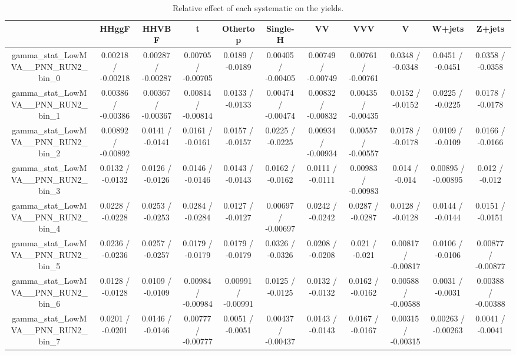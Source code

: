 \documentclass[10pt]{article}
\begin{document}
\begin{table}[htbp]
\begin{center}
\begin{tabular}{|c|c|c|c|c|c|c|c|c|c|c|}
\hline 
      & HHggF      & HHVBF      & t      & Othertop      & Single-H      & VV      & VVV      & V      & W+jets      & Z+jets \\ 
\hline 
  gamma_stat_LowMVA__PNN_RUN2_bin_0 & 0.00218 / -0.00218 & 0.00287 / -0.00287 & 0.00705 / -0.00705 & 0.0189 / -0.0189 & 0.00405 / -0.00405 & 0.00749 / -0.00749 & 0.00761 / -0.00761 & 0.0348 / -0.0348 & 0.0451 / -0.0451 & 0.0358 / -0.0358 \\ 
  gamma_stat_LowMVA__PNN_RUN2_bin_1 & 0.00386 / -0.00386 & 0.00367 / -0.00367 & 0.00814 / -0.00814 & 0.0133 / -0.0133 & 0.00474 / -0.00474 & 0.00832 / -0.00832 & 0.00435 / -0.00435 & 0.0152 / -0.0152 & 0.0225 / -0.0225 & 0.0178 / -0.0178 \\ 
  gamma_stat_LowMVA__PNN_RUN2_bin_2 & 0.00892 / -0.00892 & 0.0141 / -0.0141 & 0.0161 / -0.0161 & 0.0157 / -0.0157 & 0.0225 / -0.0225 & 0.00934 / -0.00934 & 0.00557 / -0.00557 & 0.0178 / -0.0178 & 0.0109 / -0.0109 & 0.0166 / -0.0166 \\ 
  gamma_stat_LowMVA__PNN_RUN2_bin_3 & 0.0132 / -0.0132 & 0.0126 / -0.0126 & 0.0146 / -0.0146 & 0.0143 / -0.0143 & 0.0162 / -0.0162 & 0.0111 / -0.0111 & 0.00983 / -0.00983 & 0.014 / -0.014 & 0.00895 / -0.00895 & 0.012 / -0.012 \\ 
  gamma_stat_LowMVA__PNN_RUN2_bin_4 & 0.0228 / -0.0228 & 0.0253 / -0.0253 & 0.0284 / -0.0284 & 0.0127 / -0.0127 & 0.00697 / -0.00697 & 0.0242 / -0.0242 & 0.0287 / -0.0287 & 0.0128 / -0.0128 & 0.0144 / -0.0144 & 0.0151 / -0.0151 \\ 
  gamma_stat_LowMVA__PNN_RUN2_bin_5 & 0.0236 / -0.0236 & 0.0257 / -0.0257 & 0.0179 / -0.0179 & 0.0179 / -0.0179 & 0.0326 / -0.0326 & 0.0208 / -0.0208 & 0.021 / -0.021 & 0.00817 / -0.00817 & 0.0106 / -0.0106 & 0.00877 / -0.00877 \\ 
  gamma_stat_LowMVA__PNN_RUN2_bin_6 & 0.0128 / -0.0128 & 0.0109 / -0.0109 & 0.00984 / -0.00984 & 0.00991 / -0.00991 & 0.0125 / -0.0125 & 0.0132 / -0.0132 & 0.0162 / -0.0162 & 0.00588 / -0.00588 & 0.0031 / -0.0031 & 0.00388 / -0.00388 \\ 
  gamma_stat_LowMVA__PNN_RUN2_bin_7 & 0.0201 / -0.0201 & 0.0146 / -0.0146 & 0.00777 / -0.00777 & 0.0051 / -0.0051 & 0.00437 / -0.00437 & 0.0143 / -0.0143 & 0.0167 / -0.0167 & 0.00315 / -0.00315 & 0.00263 / -0.00263 & 0.0041 / -0.0041 \\ 
\hline 
\end{tabular} 
\caption{Relative effect of each systematic on the yields.} 
\end{center} 
\end{table} 
\end{document}
